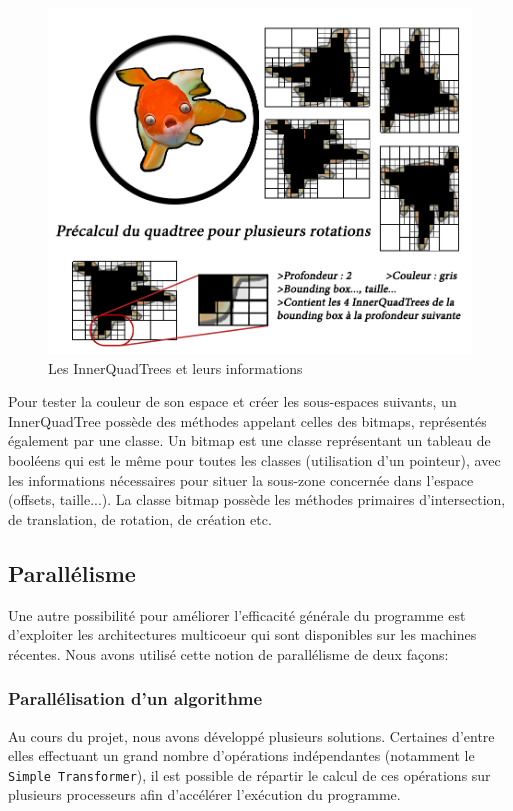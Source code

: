 \begin{figure}[H]
\centering
\includegraphics[scale=0.5]{img/innerquadtree.png}
\caption{Les InnerQuadTrees et leurs informations}
    \label{fig:innerquadtree}
\end{figure}

Pour tester la couleur de son espace et créer les sous-espaces suivants, un InnerQuadTree possède des méthodes appelant celles des bitmaps, représentés également par une classe. Un bitmap est une classe représentant un tableau de booléens qui est le même pour toutes les classes (utilisation d'un pointeur), avec les informations nécessaires pour situer la sous-zone concernée dans l'espace (offsets, taille...). La classe bitmap possède les méthodes primaires d'intersection, de translation, de rotation, de création etc.


\subsection{Parallélisme}

Une autre possibilité pour améliorer l'efficacité générale du programme est d'exploiter les architectures multicoeur qui sont disponibles sur les machines récentes. Nous avons utilisé cette notion de parallélisme de deux façons:\\

\subsubsection{Parallélisation d'un algorithme} Au cours du projet, nous avons développé plusieurs solutions. Certaines d'entre elles effectuant un grand nombre d'opérations indépendantes (notamment le \texttt{Simple Transformer}), il est possible de répartir le calcul de ces opérations sur plusieurs processeurs afin d'accélérer l'exécution du programme. 


